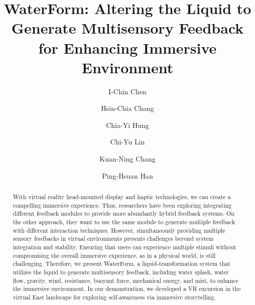 \documentclass[manuscript]{acmart} %
\begin{document}
\title{WaterForm: Altering the Liquid to Generate Multisensory Feedback for Enhancing Immersive Environment}

\author{I-Chin Chen}

\author{Hsin-Chia Chang}

\author{Chia-Yi Hung}

\author{Chi-Yu Lin}
  
\author{Kuan-Ning Chang}

\author{Ping-Hsuan Han}
\renewcommand{\shortauthors}{I-Chin Chen, et al.}

\begin{abstract}
With virtual reality head-mounted display and haptic technologies, we can create a compelling immersive experience. Thus, researchers have been exploring integrating different feedback modules to provide more abundantly hybrid feedback systems. On the other approach, they want to use the same module to generate multiple feedback with different interaction techniques. However, simultaneously providing multiple sensory feedbacks in virtual environments presents challenges beyond system integration and stability. Ensuring that users can experience multiple stimuli without compromising the overall immersive experience, as in a physical world, is still challenging. Therefore, we present WaterForm, a liquid-transformation system that utilizes the liquid to generate multisensory feedback, including water splash, water flow, gravity, wind, resistance, buoyant force, mechanical energy, and mist, to enhance the immersive environment. In our demonstration, we developed a VR excursion in the virtual East landscape for exploring self-awareness via immersive storytelling.
\vspace{-0.45em}
\end{abstract}
\end{document}
